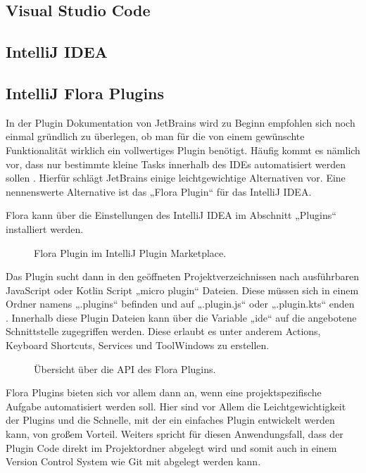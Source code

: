 \subsection{Visual Studio Code}

\subsection{IntelliJ IDEA}

\subsection{IntelliJ Flora Plugins}

In der Plugin Dokumentation von JetBrains wird zu Beginn 
empfohlen sich noch einmal gründlich zu überlegen, ob man 
für die von einem gewünschte Funktionalität wirklich ein 
vollwertiges Plugin benötigt. Häufig kommt es nämlich vor, 
dass nur bestimmte kleine Tasks innerhalb des IDEs 
automatisiert werden sollen \cite{IntelliJSDKDocumentation}. Hierfür schlägt JetBrains 
einige leichtgewichtige Alternativen vor. Eine nennenswerte 
Alternative ist das „Flora Plugin“ für das IntelliJ IDEA. 

Flora kann über die Einstellungen des IntelliJ IDEA 
im Abschnitt „Plugins“ installiert werden.


\begin{figure}
    \centering
    \caption{Flora Plugin im IntelliJ Plugin Marketplace.}
    \label{fig:FloraPlugin}
\end{figure}    
 
Das Plugin sucht dann in den geöffneten Projektverzeichnissen
nach ausführbaren JavaScript oder Kotlin Script „micro plugin“ 
Dateien. Diese müssen sich in einem Ordner namens „.plugins“ 
befinden und auf „.plugin.js“ oder „.plugin.kts“ enden \cite{FloraPluginMarketplace}.
Innerhalb diese Plugin Dateien kann über die Variable „ide“ auf 
die angebotene Schnittstelle zugegriffen werden. Diese erlaubt 
es unter anderem Actions, Keyboard Shortcuts, Services und 
ToolWindows zu erstellen.

\begin{figure}
    \centering
    \caption{Übersicht über die API des Flora Plugins.}
    \label{fig:FloraPluginAPI}
\end{figure}    
 
Flora Plugins bieten sich vor allem dann an, wenn eine projektspezifische 
Aufgabe automatisiert werden soll. Hier sind vor Allem die 
Leichtgewichtigkeit der Plugins und die Schnelle, mit der ein 
einfaches Plugin entwickelt werden kann, von großem Vorteil. 
Weiters spricht für diesen Anwendungsfall, dass der Plugin Code 
direkt im Projektordner abgelegt wird und somit auch in einem Version 
Control System wie Git mit abgelegt werden kann.
